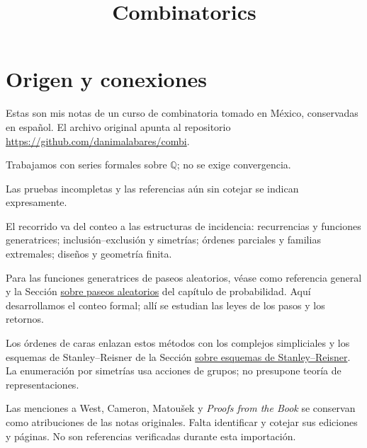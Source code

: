 


\title{Combinatorics}
\maketitle
{}
\label{section-phantom}
\tableofcontents

\section{Origen y conexiones}
\label{section-origin}
Estas son mis notas de un curso de
combinatoria tomado en México, conservadas en
español. El archivo original apunta al
repositorio
\url{https://github.com/danimalabares/combi}.

Trabajamos con series formales sobre
$\mathbb{Q}$; no se exige convergencia.

Las pruebas incompletas y las
referencias aún sin cotejar se indican
expresamente.

El recorrido va del conteo a las estructuras
de incidencia: recurrencias y funciones
generatrices; inclusión--exclusión y
simetrías; órdenes parciales y familias
extremales; diseños y geometría finita.

Para las funciones generatrices de paseos
aleatorios, véase
\cite{generatingfunctionology} como
referencia general y la Sección
\href{https://www.heap-project.org/tag/088U}
{sobre paseos aleatorios}
del capítulo de probabilidad. Aquí
desarrollamos el conteo formal; allí se
estudian las leyes de los pasos y los
retornos.

Los órdenes de caras enlazan estos métodos
con los complejos simpliciales y los esquemas
de Stanley--Reisner de la Sección
\href{https://www.heap-project.org/tag/091P}
{sobre esquemas de Stanley--Reisner}. La
enumeración por simetrías usa acciones de
grupos; no presupone teoría de
representaciones.

Las menciones a West, Cameron, Matoušek y
\emph{Proofs from the Book} se conservan como
atribuciones de las notas originales. Falta
identificar y cotejar sus ediciones y
páginas. No son referencias verificadas
durante esta importación.

